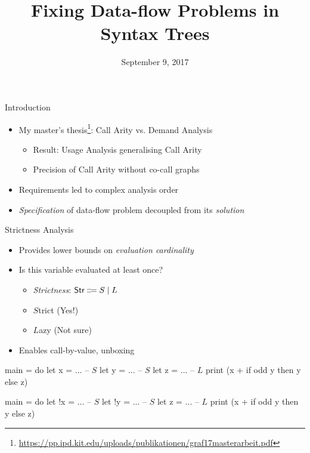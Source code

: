 \documentclass{haskellbeamer}
\title{Fixing Data-flow Problems in Syntax Trees}
\date{September 9, 2017}
\begin{document}
\maketitle

\begin{frame}{Introduction}
  \begin{itemize}
    \item My master's thesis\footnote{\tiny\url{https://pp.ipd.kit.edu/uploads/publikationen/graf17masterarbeit.pdf}}: Call Arity vs. Demand Analysis
      \begin{itemize}
        \item Result: Usage Analysis generalising Call Arity
        \item Precision of Call Arity without co-call graphs
      \end{itemize}
    \item Requirements led to complex analysis order
    \item \emph{Specification} of data-flow problem decoupled from its \emph{solution}
  \end{itemize}
\end{frame}

\begin{frame}[fragile]{Strictness Analysis}
  \begin{itemize}
    \item Provides lower bounds on \emph{evaluation cardinality}
    \item Is this variable evaluated at least once?
      \begin{itemize}
        \item \emph{Strictness}: $\text{\textsf{Str}} \Coloneqq S \mid L$
        \item $S$trict (Yes!)
        \item $L$azy (Not sure)
      \end{itemize}
    \item Enables call-by-value, unboxing
  \end{itemize}
  \begin{center}
    \begin{minipage}{0.7\textwidth}
      \begin{overprint}
        \begin{haskell}
          main = do
            let  x = ... -- $S$
            let  y = ... -- $S$
            let  z = ... -- $L$
            print (x + if odd y then y else z)
        \end{haskell}
        \begin{haskell}
          main = do
            let !x = ... -- $S$
            let !y = ... -- $S$
            let  z = ... -- $L$
            print (x + if odd y then y else z)
        \end{haskell}
      \end{overprint}
    \end{minipage}
  \end{center}
\end{frame}
\end{document}
